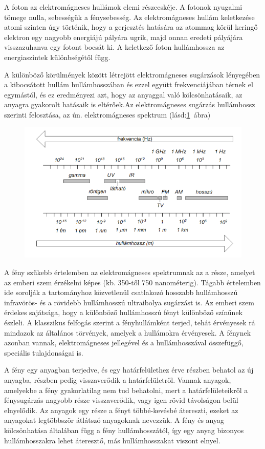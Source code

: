 A foton az elektromágneses hullámok elemi részecskéje. A fotonok nyugalmi tömege nulla, sebességük a fénysebesség. Az elektromágneses hullám keletkezése atomi szinten úgy történik, hogy a gerjesztés hatására az atommag körül keringő elektron egy nagyobb energiájú pályára ugrik, majd onnan eredeti pályájára visszazuhanva egy fotont bocsát ki. A keletkező foton hullámhossza az energiaszintek különbségétől függ.

A különböző körülmények között létrejött elektromágneses sugárzások lényegében a kibocsátott hullám hullámhosszában és ezzel együtt frekvenciájában térnek el egymástól, és ez eredményezi azt, hogy az anyaggal való kölcsönhatásaik, az anyagra gyakorolt hatásaik is eltérőek.Az elektromágneses sugárzás hullámhossz szerinti felosztása, az ún. elektromágneses spektrum (lásd:\ref{fig:9-electromagneticspectrum}~ábra)
\begin{figure}[h]
	\centering
	\includegraphics[width=0.7\linewidth]{fig/9-Electromagnetic_spectrum}
	\caption{}
	\label{fig:9-electromagneticspectrum}
\end{figure}

A fény szűkebb értelemben az elektromágneses spektrumnak az a része, amelyet az emberi szem érzékelni képes (kb. 350-től 750 nanométerig). Tágabb értelemben ide sorolják a tartományhoz közvetlenül csatlakozó hosszabb hullámhosszú infravörös- és a rövidebb hullámhosszú ultraibolya sugárzást is. Az emberi szem érdekes sajátsága, hogy a különböző hullámhosszú fényt különböző színűnek észleli. A klasszikus felfogás szerint a fényhullámként terjed, tehát érvényesek rá mindazok az általános törvények, amelyek a hullámokra érvényesek. A fénynek azonban vannak, elektromágneses jellegével és a hullámhosszával összefüggő, speciális tulajdonságai is.

A fény egy anyagban terjedve, és egy határfelülethez érve részben behatol az új anyagba, részben pedig visszaverődik a határfelületről. Vannak anyagok, amelyekbe a fény gyakorlatilag nem tud behatolni, mert a határfelületeikről a fénysugárzás nagyobb része visszaverődik, vagy igen rövid távolságon belül elnyelődik. Az anyagok egy része a fényt többé-kevésbé átereszti, ezeket az anyagokat legtöbbször átlátszó anyagoknak nevezzük. A fény és anyag kölcsönhatása általában függ a fény hullámhosszától, így egy anyag bizonyos hullámhosszakra lehet áteresztő, más hullámhosszakat viszont elnyel.


